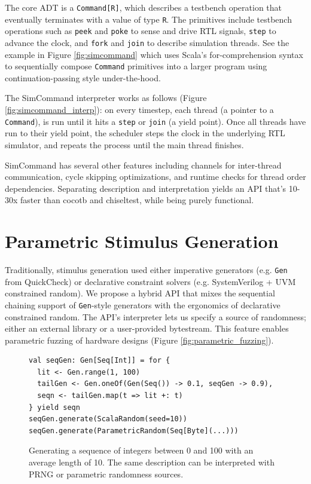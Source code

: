 \documentclass[sigplan,review,nonacm,9pt]{acmart}
\begin{document}
The core ADT is a \texttt{Command[R]}, which describes a testbench operation that eventually terminates with a value of type \texttt{R}.
The primitives include testbench operations such as \texttt{peek} and \texttt{poke} to sense and drive RTL signals, \texttt{step} to advance the clock, and \texttt{fork} and \texttt{join} to describe simulation threads.
See the example in Figure \ref{fig:simcommand} which uses Scala's for-comprehension syntax to sequentially compose \texttt{Command} primitives into a larger program using continuation-passing style under-the-hood.

The SimCommand interpreter works as follows (Figure \ref{fig:simcommand_interp}): on every timestep, each thread (a pointer to a \texttt{Command}), is run until it hits a \texttt{step} or \texttt{join} (a yield point).
Once all threads have run to their yield point, the scheduler steps the clock in the underlying RTL simulator, and repeats the process until the main thread finishes.

SimCommand has several other features including channels for inter-thread communication, cycle skipping optimizations, and runtime checks for thread order dependencies.
Separating description and interpretation yields an API that's 10-30x faster than cocotb and chiseltest, while being purely functional.


\section{Parametric Stimulus Generation}

Traditionally, stimulus generation used either imperative generators (e.g. \texttt{Gen} from QuickCheck\cite{quickcheck}) or declarative constraint solvers (e.g. SystemVerilog + UVM constrained random\cite{riscv_dv}).
We propose a hybrid API that mixes the sequential chaining support of \texttt{Gen}-style generators with the ergonomics of declarative constrained random.
The API's interpreter lets us specify a source of randomness; either an external library or a user-provided bytestream.
This feature enables parametric fuzzing\cite{zest} of hardware designs (Figure \ref{fig:parametric_fuzzing}).

\begin{figure}
\begin{verbatim}
val seqGen: Gen[Seq[Int]] = for {
  lit <- Gen.range(1, 100)
  tailGen <- Gen.oneOf(Gen(Seq()) -> 0.1, seqGen -> 0.9),
  seqn <- tailGen.map(t => lit +: t)
} yield seqn
seqGen.generate(ScalaRandom(seed=10))
seqGen.generate(ParametricRandom(Seq[Byte](...)))
\end{verbatim}
\caption{Generating a sequence of integers between 0 and 100 with an average length of 10. The same description can be interpreted with PRNG or parametric randomness sources.}
\label{fig:randomapi}
\end{figure}
\end{document}
